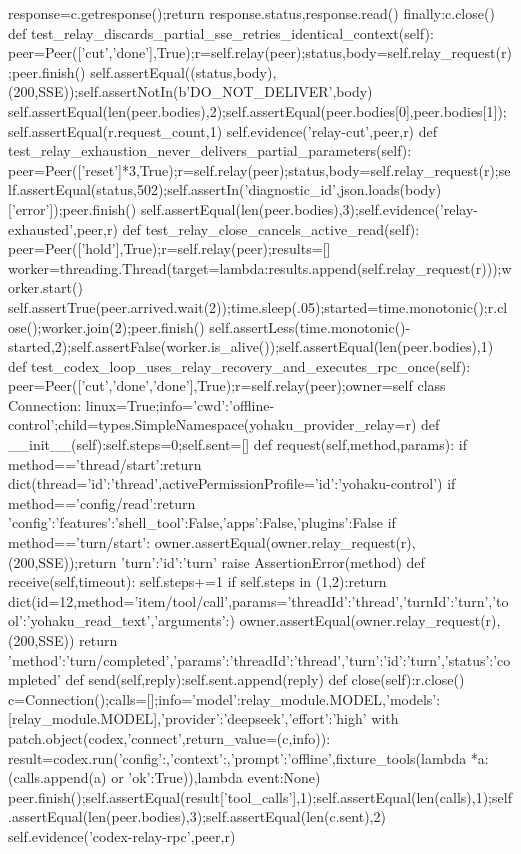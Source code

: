 {            response=c.getresponse();return response.status,response.read()
        finally:c.close()
    def test_relay_discards_partial_sse_retries_identical_context(self):
        peer=Peer(['cut','done'],True);r=self.relay(peer);status,body=self.relay_request(r);peer.finish()
        self.assertEqual((status,body),(200,SSE));self.assertNotIn(b'DO_NOT_DELIVER',body)
        self.assertEqual(len(peer.bodies),2);self.assertEqual(peer.bodies[0],peer.bodies[1]);self.assertEqual(r.request_count,1)
        self.evidence('relay-cut',peer,r)
    def test_relay_exhaustion_never_delivers_partial_parameters(self):
        peer=Peer(['reset']*3,True);r=self.relay(peer);status,body=self.relay_request(r);self.assertEqual(status,502);self.assertIn('diagnostic_id',json.loads(body)['error']);peer.finish()
        self.assertEqual(len(peer.bodies),3);self.evidence('relay-exhausted',peer,r)
    def test_relay_close_cancels_active_read(self):
        peer=Peer(['hold'],True);r=self.relay(peer);results=[]
        worker=threading.Thread(target=lambda:results.append(self.relay_request(r)));worker.start()
        self.assertTrue(peer.arrived.wait(2));time.sleep(.05);started=time.monotonic();r.close();worker.join(2);peer.finish()
        self.assertLess(time.monotonic()-started,2);self.assertFalse(worker.is_alive());self.assertEqual(len(peer.bodies),1)
    def test_codex_loop_uses_relay_recovery_and_executes_rpc_once(self):
        peer=Peer(['cut','done','done'],True);r=self.relay(peer);owner=self
        class Connection:
            linux=True;info={'cwd':'offline-control'};child=types.SimpleNamespace(yohaku_provider_relay=r)
            def __init__(self):self.steps=0;self.sent=[]
            def request(self,method,params):
                if method=='thread/start':return dict(thread={'id':'thread'},activePermissionProfile={'id':'yohaku-control'})
                if method=='config/read':return {'config':{'features':{'shell_tool':False,'apps':False,'plugins':False}}}
                if method=='turn/start':
                    owner.assertEqual(owner.relay_request(r),(200,SSE));return {'turn':{'id':'turn'}}
                raise AssertionError(method)
            def receive(self,timeout):
                self.steps+=1
                if self.steps in (1,2):return dict(id=12,method='item/tool/call',params={'threadId':'thread','turnId':'turn','tool':'yohaku_read_text','arguments':{}})
                owner.assertEqual(owner.relay_request(r),(200,SSE))
                return {'method':'turn/completed','params':{'threadId':'thread','turn':{'id':'turn','status':'completed'}}}
            def send(self,reply):self.sent.append(reply)
            def close(self):r.close()
        c=Connection();calls=[];info={'model':relay_module.MODEL,'models':[relay_module.MODEL],'provider':'deepseek','effort':'high'}
        with patch.object(codex,'connect',return_value=(c,info)):
            result=codex.run({'config':{},'context':{},'prompt':'offline'},fixture_tools(lambda *a:(calls.append(a) or {'ok':True})),lambda event:None)
        peer.finish();self.assertEqual(result['tool_calls'],1);self.assertEqual(len(calls),1);self.assertEqual(len(peer.bodies),3);self.assertEqual(len(c.sent),2)
        self.evidence('codex-relay-rpc',peer,r)

}
